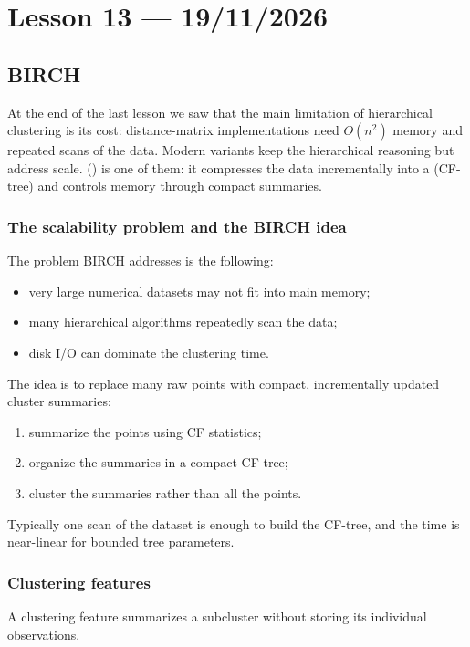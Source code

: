 \section{Lesson 13 --- 19/11/2026}

\subsection{BIRCH}

At the end of the last lesson we saw that the main limitation of hierarchical clustering is its cost: distance-matrix implementations need $O(n^2)$ memory and repeated scans of the data. Modern variants keep the hierarchical reasoning but address scale.  () is one of them: it compresses the data incrementally into a  (CF-tree) and controls memory through compact summaries.

\subsubsection{The scalability problem and the BIRCH idea}

The problem BIRCH addresses is the following:
\begin{itemize}
  \item very large numerical datasets may not fit into main memory;
  \item many hierarchical algorithms repeatedly scan the data;
  \item disk I/O can dominate the clustering time.
\end{itemize}
The idea is to replace many raw points with compact, incrementally updated cluster summaries:
\begin{enumerate}
  \item summarize the points using CF statistics;
  \item organize the summaries in a compact CF-tree;
  \item cluster the summaries rather than all the points.
\end{enumerate}
Typically one scan of the dataset is enough to build the CF-tree, and the time is near-linear for bounded tree parameters.

\subsubsection{Clustering features}

A clustering feature summarizes a subcluster without storing its individual observations.

